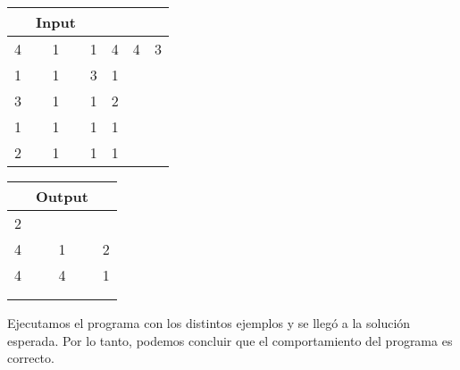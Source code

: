 \documentclass[11pt, a4paper, twoside]{article}
\begin{document}
\begin{itemize}
\begin{itemize}
\begin{itemize}
					\begin{minipage}{0.4\textwidth}
							\begin{tabular}{cccccc}
							 & Input \\
							   \hline
							   4 & 1 & 1 & 4 & 4 & 3\\
							   1 & 1 & 3 & 1 &   &  \\
							   3 & 1 & 1 & 2 &   &  \\
							   1 & 1 & 1 & 1 &   &  \\
							   2 & 1 & 1 & 1 &   &  \\
							\end{tabular}
						\end{minipage} 
							\begin{minipage}{0.3\textwidth}
								\begin{tabular}{ccc}
								  & Output \\
								   \hline
								   2 &   &   \\
								   4 & 1 & 2 \\
								   4 & 4 & 1 \\
								    \\
								    \\
							\end{tabular}
					\end{minipage} 						
				
			\end{itemize}
	\end{itemize}
\end{itemize}

Ejecutamos el programa con los distintos ejemplos y se lleg\'o a la soluci\'on esperada. 
Por lo tanto, podemos concluir que el comportamiento del programa es correcto. 
\end{document}
